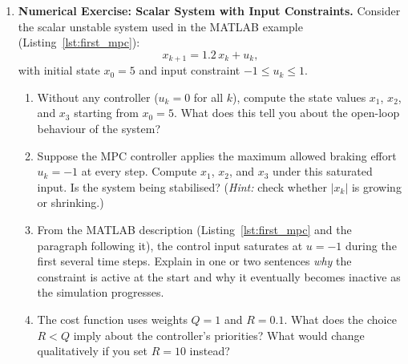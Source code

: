 \begin{enumerate}
	\item \textbf{Numerical Exercise: Scalar System with Input Constraints.}
	Consider the scalar unstable system used in the MATLAB example (Listing~\ref{lst:first_mpc}):
	\[
		x_{k+1} = 1.2\, x_k + u_k,
	\]
	with initial state $x_0 = 5$ and input constraint $-1 \le u_k \le 1$.
	\begin{enumerate}
		\item[(a)] Without any controller ($u_k = 0$ for all $k$), compute the state values $x_1$, $x_2$, and $x_3$ starting from $x_0 = 5$. What does this tell you about the open-loop behaviour of the system?
		\item[(b)] Suppose the MPC controller applies the maximum allowed braking effort $u_k = -1$ at every step. Compute $x_1$, $x_2$, and $x_3$ under this saturated input. Is the system being stabilised? (\emph{Hint:} check whether $|x_k|$ is growing or shrinking.)
		\item[(c)] From the MATLAB description (Listing~\ref{lst:first_mpc} and the paragraph following it), the control input saturates at $u = -1$ during the first several time steps. Explain in one or two sentences \emph{why} the constraint is active at the start and why it eventually becomes inactive as the simulation progresses.
		\item[(d)] The cost function uses weights $Q = 1$ and $R = 0.1$. What does the choice $R < Q$ imply about the controller's priorities? What would change qualitatively if you set $R = 10$ instead?
	\end{enumerate}


\end{enumerate}

